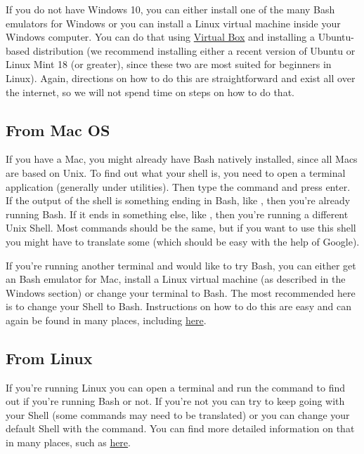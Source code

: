 \documentclass[letterpaper,10pt,openany,oneside]{sphinxmanual}
\begin{document}
If you do not have Windows 10, you can either install one of the many Bash
emulators for Windows or you can install a Linux virtual machine inside your
Windows computer.  You can do that using \href{https://www.virtualbox.org/wiki/Downloads}{Virtual Box} and installing a Ubuntu-based
distribution (we recommend installing either a recent version of Ubuntu or
Linux Mint 18 (or greater), since these two are most suited for beginners in
Linux). Again, directions on how to do this are straightforward and exist all
over the internet, so we will not spend time on steps on how to do that.


\subsection{From Mac OS}
\label{bash:from-mac-os}
If you have a Mac, you might already have Bash natively installed, since all
Macs are based on Unix. To find out what your shell is, you need to open a
terminal application (generally under utilities). Then type the command  and press enter. If the output of the shell is something ending in
Bash, like , then you're already running Bash. If it ends in
something else, like , then you're running a different Unix Shell.
Most commands should be the same, but if you want to use this shell you might
have to translate some (which should be easy with the help of Google).

If you're running another terminal and would like to try Bash, you can either
get an Bash emulator for Mac, install a Linux virtual machine (as described in
the Windows section) or change your terminal to Bash. The most recommended here
is to change your Shell to Bash. Instructions on how to do this are easy and
can again be found in many places, including \href{http://osxdaily.com/2012/03/21/change-shell-mac-os-x/}{here}.


\subsection{From Linux}
\label{bash:from-linux}
If you're running Linux you can open a terminal and run the command  to find out if you're running Bash or not. If you're not you can try to
keep going with your Shell (some commands may need to be translated) or you can
change your default Shell with the  command. You can find more detailed
information on that in many places, such as \href{http://stackoverflow.com/questions/13046192/changing-default-shell-in-linux}{here}.
\end{document}
